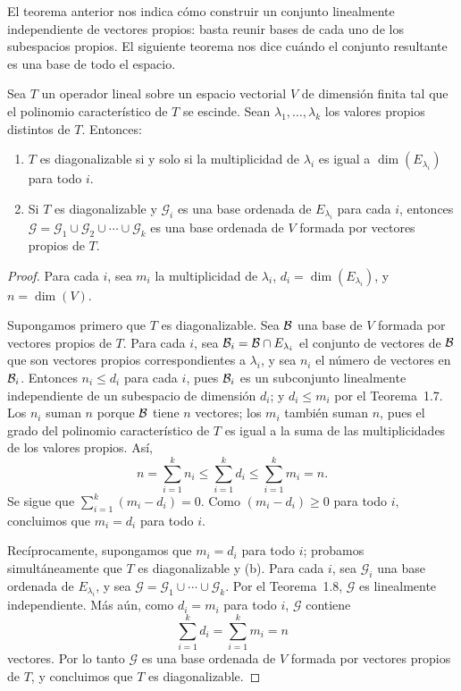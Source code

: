 \documentclass[12pt,a4paper]{book}
\begin{document}
    El teorema anterior nos indica cómo construir un conjunto linealmente independiente de vectores propios: basta reunir bases de cada uno de los subespacios propios. El siguiente teorema nos dice cuándo el conjunto resultante es una base de todo el espacio.

    \begin{teorema}
        Sea $T$ un operador lineal sobre un espacio vectorial $V$ de dimensión finita tal que el polinomio característico de $T$ se escinde. Sean $\lambda_1,\dots,\lambda_k$ los valores propios distintos de $T$. Entonces:
        \begin{enumerate}[label=(\alph*)]
            \item $T$ es diagonalizable si y solo si la multiplicidad de $\lambda_i$ es igual a $\dim(E_{\lambda_i})$ para todo $i$.
            \item Si $T$ es diagonalizable y $\mathcal{G}_i$ es una base ordenada de $E_{\lambda_i}$ para cada $i$, entonces $\mathcal{G}=\mathcal{G}_1\cup\mathcal{G}_2\cup\cdots\cup\mathcal{G}_k$ es una base ordenada de $V$ formada por vectores propios de $T$.
        \end{enumerate}
    \end{teorema}

    \begin{proof}
        Para cada $i$, sea $m_i$ la multiplicidad de $\lambda_i$, $d_i=\dim(E_{\lambda_i})$, y $n=\dim(V)$.

        Supongamos primero que $T$ es diagonalizable. Sea $\mathcal{B}$ una base de $V$ formada por vectores propios de $T$. Para cada $i$, sea $\mathcal{B}_i=\mathcal{B}\cap E_{\lambda_i}$ el conjunto de vectores de $\mathcal{B}$ que son vectores propios correspondientes a $\lambda_i$, y sea $n_i$ el número de vectores en $\mathcal{B}_i$. Entonces $n_i\leq d_i$ para cada $i$, pues $\mathcal{B}_i$ es un subconjunto linealmente independiente de un subespacio de dimensión $d_i$; y $d_i\leq m_i$ por el Teorema~1.7. Los $n_i$ suman $n$ porque $\mathcal{B}$ tiene $n$ vectores; los $m_i$ también suman $n$, pues el grado del polinomio característico de $T$ es igual a la suma de las multiplicidades de los valores propios. Así,
        \begin{equation*}
            n=\sum_{i=1}^{k}n_i\leq\sum_{i=1}^{k}d_i\leq\sum_{i=1}^{k}m_i=n.
        \end{equation*}
        Se sigue que $\sum_{i=1}^{k}(m_i-d_i)=0$. Como $(m_i-d_i)\geq 0$ para todo $i$, concluimos que $m_i=d_i$ para todo $i$.

        Recíprocamente, supongamos que $m_i=d_i$ para todo $i$; probamos simultáneamente que $T$ es diagonalizable y (b). Para cada $i$, sea $\mathcal{G}_i$ una base ordenada de $E_{\lambda_i}$, y sea $\mathcal{G}=\mathcal{G}_1\cup\cdots\cup\mathcal{G}_k$. Por el Teorema~1.8, $\mathcal{G}$ es linealmente independiente. Más aún, como $d_i=m_i$ para todo $i$, $\mathcal{G}$ contiene
        \begin{equation*}
            \sum_{i=1}^{k}d_i=\sum_{i=1}^{k}m_i=n
        \end{equation*}
        vectores. Por lo tanto $\mathcal{G}$ es una base ordenada de $V$ formada por vectores propios de $T$, y concluimos que $T$ es diagonalizable.
    \end{proof}
\end{document}
